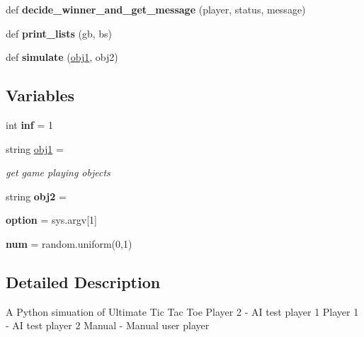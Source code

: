\begin{DoxyCompactItemize}
\item 
def {\bfseries decide\+\_\+winner\+\_\+and\+\_\+get\+\_\+message} (player, status, message)\hypertarget{namespacesimulator_a7cd222b72823285f1599e00edbc5321a}{}\label{namespacesimulator_a7cd222b72823285f1599e00edbc5321a}

\item 
def {\bfseries print\+\_\+lists} (gb, bs)\hypertarget{namespacesimulator_a41eeaf13839dd5ee2637c87b29e91d1a}{}\label{namespacesimulator_a41eeaf13839dd5ee2637c87b29e91d1a}

\item 
def {\bfseries simulate} (\hyperlink{namespacesimulator_a0959268797d7e20ce30ad540652df09c}{obj1}, obj2)\hypertarget{namespacesimulator_a655a7bd5141e96e66d3955394af60234}{}\label{namespacesimulator_a655a7bd5141e96e66d3955394af60234}

\end{DoxyCompactItemize}
\subsection*{Variables}
\begin{DoxyCompactItemize}
\item 
int {\bfseries inf} = 1\hypertarget{namespacesimulator_a3fec35fa935a5c32d8588b1493526364}{}\label{namespacesimulator_a3fec35fa935a5c32d8588b1493526364}

\item 
string \hyperlink{namespacesimulator_a0959268797d7e20ce30ad540652df09c}{obj1} = \textquotesingle{}\textquotesingle{}\hypertarget{namespacesimulator_a0959268797d7e20ce30ad540652df09c}{}\label{namespacesimulator_a0959268797d7e20ce30ad540652df09c}

\begin{DoxyCompactList}\small\item\em get game playing objects \end{DoxyCompactList}\item 
string {\bfseries obj2} = \textquotesingle{}\textquotesingle{}\hypertarget{namespacesimulator_aa3d45be0f080d6af27999657e50e7674}{}\label{namespacesimulator_aa3d45be0f080d6af27999657e50e7674}

\item 
{\bfseries option} = sys.\+argv\mbox{[}1\mbox{]}\hypertarget{namespacesimulator_aecffc3da633925ffc656e91c5888008b}{}\label{namespacesimulator_aecffc3da633925ffc656e91c5888008b}

\item 
{\bfseries num} = random.\+uniform(0,1)\hypertarget{namespacesimulator_a05c130ea7b953857514cba6eb9ee710f}{}\label{namespacesimulator_a05c130ea7b953857514cba6eb9ee710f}

\end{DoxyCompactItemize}


\subsection{Detailed Description}
\begin{DoxyVerb}A Python simuation of Ultimate Tic Tac Toe
Player 2 - AI test player 1 
Player 1 - AI test player 2
Manual   - Manual user player
\end{DoxyVerb}
 
